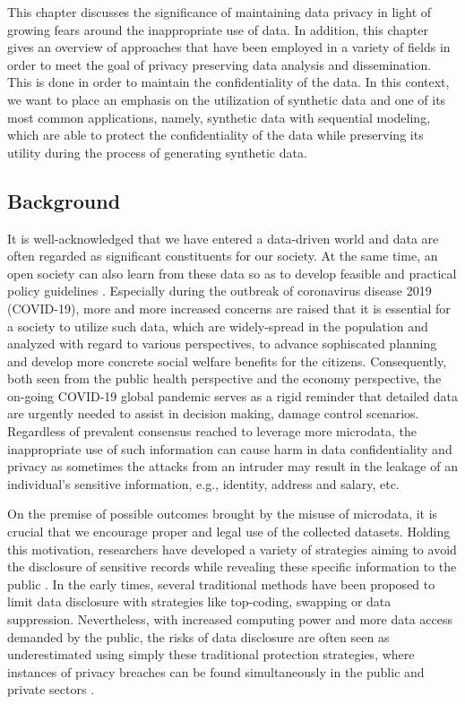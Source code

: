 This chapter discusses the significance of maintaining data privacy in light of growing fears around the inappropriate use of data. In addition, this chapter gives an overview of approaches that have been employed in a variety of fields in order to meet the goal of privacy preserving data analysis and dissemination. This is done in order to maintain the confidentiality of the data. In this context, we want to place an emphasis on the utilization of synthetic data and one of its most common applications, namely, synthetic data with sequential modeling, which are able to protect the confidentiality of the data while preserving its utility during the process of generating synthetic data.

\subsection{Background}
\label{subsec:dataprivacy}
It is well-acknowledged that we have entered a data-driven world and data are 
often regarded as significant constituents for our society. At the same time, 
an open society can also learn from these data so as to develop feasible 
and practical policy guidelines \citep{evans2021statistically}. Especially 
during the outbreak of coronavirus disease 2019 (COVID-19), more and more increased concerns are raised that it is 
essential for a society to utilize such data, which are widely-spread in the population
and analyzed with regard to various perspectives, to advance sophiscated planning
and develop more concrete social welfare benefits for the citizens. Consequently,
both seen from the public health perspective and the economy perspective, the on-going
COVID-19 global pandemic serves as a rigid reminder that detailed data are urgently 
needed to assist in decision making, damage control scenarios. Regardless of prevalent
consensus reached to leverage more microdata, the inappropriate use of such 
information can cause harm in data confidentiality and privacy as sometimes the attacks
from an intruder may result in the leakage of an individual's sensitive information, e.g., identity, 
address and salary, etc.


On the premise of possible outcomes brought by the misuse of microdata, it is crucial that 
we encourage proper and legal use of the collected datasets. Holding this motivation, researchers 
have developed a variety of strategies aiming to avoid the disclosure of sensitive records while
revealing these specific information to the public \citep{duncan2011statistical}. In the early times, 
several traditional methods have been proposed to limit data disclosure with strategies like top-coding,
swapping or data suppression. Nevertheless, with increased computing power and more data access demanded by
the public, the risks of data disclosure are often seen as underestimated using simply these traditional
protection strategies, where instances of privacy breaches can be found simultaneously in the public and 
private sectors \citep{de2015unique}.

